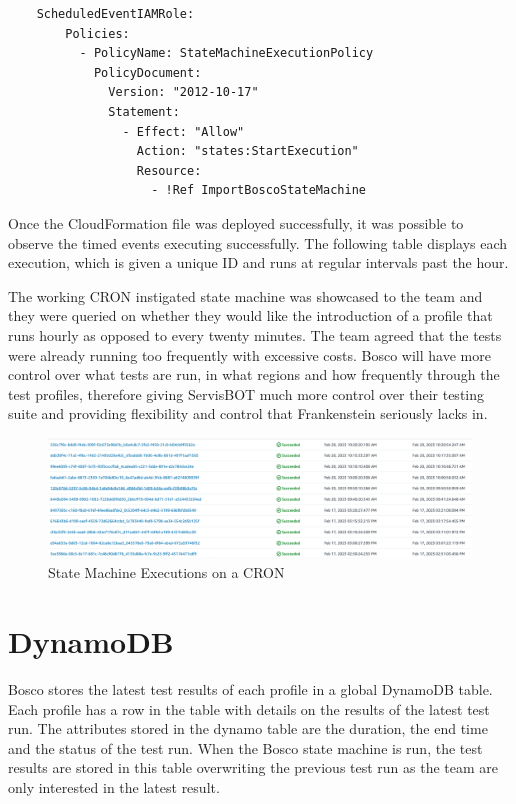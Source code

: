 \documentclass[12pt,a4paper,titlepage]{report}
\begin{document}
\begin{itemize}
 \begin{tcolorbox}
  \begin{verbatim}
    ScheduledEventIAMRole:
        Policies:
          - PolicyName: StateMachineExecutionPolicy
            PolicyDocument:
              Version: "2012-10-17"
              Statement:
                - Effect: "Allow"
                  Action: "states:StartExecution"
                  Resource:
                    - !Ref ImportBoscoStateMachine
  \end{verbatim}
 \end{tcolorbox}
\end{itemize}

Once the  CloudFormation file was deployed successfully, it was possible to observe the timed events executing successfully. The following table displays  
each execution, which is  given a unique ID and runs at regular intervals past the hour. 

The working CRON instigated state machine was showcased to the team and they were 
queried on whether they would like the introduction of a profile that runs hourly as opposed to every twenty minutes. 
The team agreed that the tests were already running too frequently with excessive costs. Bosco will have more control over what tests are run, in what regions and how frequently through the test profiles, therefore giving ServisBOT 
much more control over their testing suite and providing flexibility and control that Frankenstein seriously lacks in.

\begin{figure}[ht]
  \centering
  \includegraphics[width=15cm]{./diagrams/state_machine_cron_executions.png}
  \caption{State Machine Executions on a CRON }
 \end{figure}

\section{DynamoDB}
Bosco stores the latest test results of each profile in a global DynamoDB table. 
Each profile has a row in the table with details on the results of the latest test run. 
The attributes stored in the dynamo table are the duration, the end time and the status of the test run. 
When the Bosco state machine is run, the test results are stored in this table overwriting the previous test run as the team are only interested in the latest result.
\end{document}
